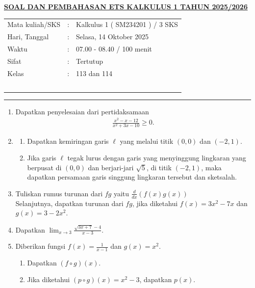 \documentclass[10pt,openany,a4paper]{article}
\theoremstyle{definition}
\theoremstyle{definition}
\theoremstyle{plain}
\begin{document}
\newpage
 \begin{center}
	{\underline{\textbf{\MakeUppercase{Soal dan Pembahasan ETS Kalkulus 1 Tahun 2025/2026}}}}
    \end{center}

    \begin{center}
	\begin{tabular}{lcl}
		Mata kuliah/SKS & : & Kalkulus 1 ( SM234201 ) / 3 SKS\\
		Hari, Tanggal & : & Selasa, 14 Oktober 2025\\
		Waktu & : & 07.00 - 08.40 / 100 menit\\
		Sifat & : & Tertutup\\
		Kelas & : & 113 dan 114\\
  ~
	\end{tabular}
    
    \noindent\rule{\textwidth}{2.pt}
        \end{center}
        \begin{enumerate}
            \item Dapatkan penyelesaian dari pertidaksamaan 
            \begin{align*}
                \frac{x^2-x-12}{x^2+3x-10}\geq 0.
            \end{align*}
            \item \begin{enumerate}
                \item Dapatkan kemiringan garis $\ell$ yang melalui titik $(0,0)$ dan $(-2,1)$.
                \item Jika garis $\ell$ tegak lurus dengan garis yang menyinggung lingkaran yang berpusat di $(0,0)$ dan berjari-jari $\sqrt{5}$, di titik $(-2,1)$, maka dapatkan persamaan garis singgung lingkaran tersebut dan sketsalah.
            \end{enumerate}
            \item Tuliskan rumus turunan dari $fg$ yaitu $\frac{d}{dx}(f(x)g(x))$\\
            Selanjutnya, dapatkan turunan dari $fg$, jika diketahui $f(x)=3x^2-7x$ dan $g(x)=3-2x^2$.
            \item Dapatkan $\displaystyle \lim_{x\to 3} \frac{\sqrt{3x+7}-4}{x-3}$.
            \item Diberikan fungsi $f(x)=\frac{1}{x-1}$ dan $g(x)=x^2$.
            \begin{enumerate}
                \item Dapatkan $(f\circ g)(x)$.
                \item Jika diketahui $(p\circ g)(x)=  x^2-3$, dapatkan $p(x)$.
            \end{enumerate}
        \end{enumerate}
\end{document}
